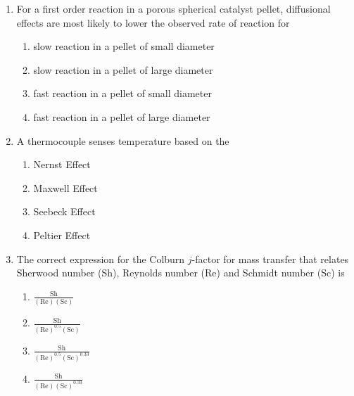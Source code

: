 \documentclass[12pt]{article}
\begin{document}
\begin{enumerate}[label=Q.\arabic*]
		\begin{multicols}{2}
			\begin{enumerate}[label=(\Alph*)]
				\item \texttt{[image: ch\_q10a.jpg]}
				\item \texttt{[image: ch\_q10b.jpg]}
				\item \texttt{[image: ch\_q10c.jpg]}
				\item \texttt{[image: ch\_q10d.jpg]}
			\end{enumerate}
		\end{multicols}

	\item For a first order reaction in a porous spherical catalyst pellet, diffusional effects are most likely to lower the observed rate of reaction for
		\begin{multicols}{2}
			\begin{enumerate}[label=(\Alph*)]
				\item slow reaction in a pellet of small diameter
				\item slow reaction in a pellet of large diameter
				\item fast reaction in a pellet of small diameter
				\item fast reaction in a pellet of large diameter
			\end{enumerate}
		\end{multicols}

	\item A thermocouple senses temperature based on the
		\begin{multicols}{2}
			\begin{enumerate}[label=(\Alph*)]
				\item Nernst Effect
				\item Maxwell Effect
				\item Seebeck Effect
				\item Peltier Effect
			\end{enumerate}
		\end{multicols}

	\item The correct expression for the Colburn $j$-factor for mass transfer that relates Sherwood number (Sh), Reynolds number (Re) and Schmidt number (Sc) is
		\begin{multicols}{4}
			\begin{enumerate}[label=(\Alph*)]
				\item $\frac{\text{Sh}}{(\text{Re})(\text{Sc})}$
				\item $\frac{\text{Sh}}{(\text{Re})^{0.5}(\text{Sc})}$
				\item $\frac{\text{Sh}}{(\text{Re})^{0.5}(\text{Sc})^{0.33}}$
				\item $\frac{\text{Sh}}{(\text{Re})(\text{Sc})^{0.33}}$
			\end{enumerate}
		\end{multicols}


\end{enumerate}
\end{document}
